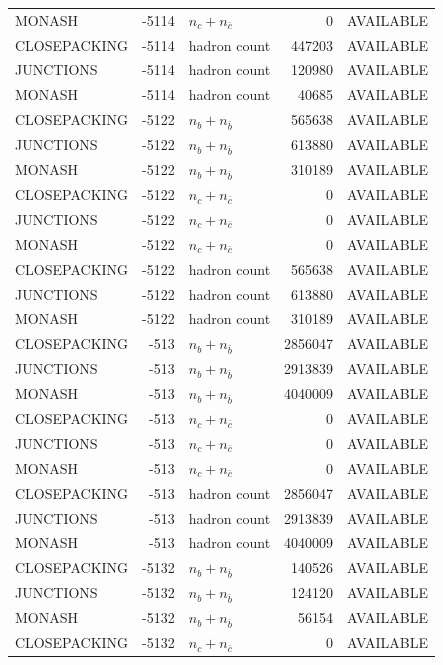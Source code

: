 \begin{landscape}
\begin{longtable}{@{}lrlrl@{}}
MONASH & -5114 & $n_c+n_{\bar c}$ & \num{0} & AVAILABLE \\
CLOSEPACKING & -5114 & hadron count & \num{447203} & AVAILABLE \\
JUNCTIONS & -5114 & hadron count & \num{120980} & AVAILABLE \\
MONASH & -5114 & hadron count & \num{40685} & AVAILABLE \\
CLOSEPACKING & -5122 & $n_b+n_{\bar b}$ & \num{565638} & AVAILABLE \\
JUNCTIONS & -5122 & $n_b+n_{\bar b}$ & \num{613880} & AVAILABLE \\
MONASH & -5122 & $n_b+n_{\bar b}$ & \num{310189} & AVAILABLE \\
CLOSEPACKING & -5122 & $n_c+n_{\bar c}$ & \num{0} & AVAILABLE \\
JUNCTIONS & -5122 & $n_c+n_{\bar c}$ & \num{0} & AVAILABLE \\
MONASH & -5122 & $n_c+n_{\bar c}$ & \num{0} & AVAILABLE \\
CLOSEPACKING & -5122 & hadron count & \num{565638} & AVAILABLE \\
JUNCTIONS & -5122 & hadron count & \num{613880} & AVAILABLE \\
MONASH & -5122 & hadron count & \num{310189} & AVAILABLE \\
CLOSEPACKING & -513 & $n_b+n_{\bar b}$ & \num{2856047} & AVAILABLE \\
JUNCTIONS & -513 & $n_b+n_{\bar b}$ & \num{2913839} & AVAILABLE \\
MONASH & -513 & $n_b+n_{\bar b}$ & \num{4040009} & AVAILABLE \\
CLOSEPACKING & -513 & $n_c+n_{\bar c}$ & \num{0} & AVAILABLE \\
JUNCTIONS & -513 & $n_c+n_{\bar c}$ & \num{0} & AVAILABLE \\
MONASH & -513 & $n_c+n_{\bar c}$ & \num{0} & AVAILABLE \\
CLOSEPACKING & -513 & hadron count & \num{2856047} & AVAILABLE \\
JUNCTIONS & -513 & hadron count & \num{2913839} & AVAILABLE \\
MONASH & -513 & hadron count & \num{4040009} & AVAILABLE \\
CLOSEPACKING & -5132 & $n_b+n_{\bar b}$ & \num{140526} & AVAILABLE \\
JUNCTIONS & -5132 & $n_b+n_{\bar b}$ & \num{124120} & AVAILABLE \\
MONASH & -5132 & $n_b+n_{\bar b}$ & \num{56154} & AVAILABLE \\
CLOSEPACKING & -5132 & $n_c+n_{\bar c}$ & \num{0} & AVAILABLE \\

\end{longtable}
\end{landscape}
